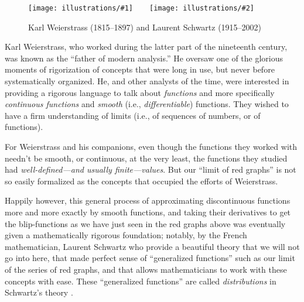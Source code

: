 \documentclass[openany]{book}
\newcommand{\illtwo}[4]{%
   \begin{figure}[H]\centering%
   \texttt{[image: illustrations/\#1]}$\qquad$\texttt{[image: illustrations/\#2]}%
   \caption{#4}%
    \end{figure}}
\theoremstyle{plain}
\theoremstyle{definition}
\begin{document}

 \illtwo{weierstrass}{schwartz}{.3}{Karl Weierstrass (1815--1897) and Laurent Schwartz (1915--2002)}

 Karl Weierstrass, who worked during the latter part of the nineteenth
 century, was known as the ``father of modern analysis.'' He oversaw
 one of the glorious moments of rigorization of concepts that were
 long in use, but never before systematically organized.  He, and
 other analysts of the time, were interested in providing a rigorous
 language to talk about {\it functions} and more specifically {\it
   continuous functions} and {\it smooth} (i.e., {\it differentiable})
 functions. They wished to have a firm understanding of limits (i.e.,
 of sequences of numbers, or of functions).


 For Weierstrass and his companions, even though the functions they
 worked with needn't be smooth, or continuous, at the very least, the
 functions they studied had {\it well-defined---and usually
   finite---values}.  But our ``limit of red graphs'' is not so easily
 formalized as the concepts that occupied the efforts of
 Weierstrass.

 Happily however, this general process of approximating
 discontinuous functions more and more exactly by smooth functions,
 and taking their derivatives to get the blip-functions as we have
 just seen in the red graphs above was eventually given a
 mathematically rigorous foundation; notably, by the French
 mathematician, Laurent Schwartz who provide a beautiful theory that
 we will not go into here, that made perfect sense of ``generalized
 functions'' such as our limit of the series of red graphs, and that
 allows mathematicians to work with these concepts with ease. These
 ``generalized functions'' are called {\it distributions} in
 Schwartz's theory .
\end{document}
